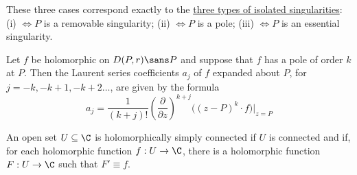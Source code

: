 These three cases correspond exactly to the \href{a7f062e}{three types of
isolated singularities}: (i) $\iff P$ is a removable singularity; (ii) $\iff P$
is a pole; (iii) $\iff P$ is an essential singularity.

\label{c1d2d0c}

Let $f$ be holomorphic on $D(P,r)\sans P$ and suppose that $f$ has a pole of
order $k$ at $P$. Then the Laurent series coefficients $a_j$ of $f$ expanded
about $P$, for $j=-k,-k+1,-k+2\ldots$, are given by the formula
$$
  a_j=\frac1{(k+j)!}\left(\frac\partial{\partial z}\right)^{k+j}
  \big((z-P)^k\cdot f\big)\Bigg|_{z=P}
$$

\label{d20898f}

An open set $U\subseteq\C$ is holomorphically simply connected if $U$ is
connected and if, for each holomorphic function $f:U\to\C$, there is a
holomorphic function $F:U\to\C$ such that $F'\equiv f$.